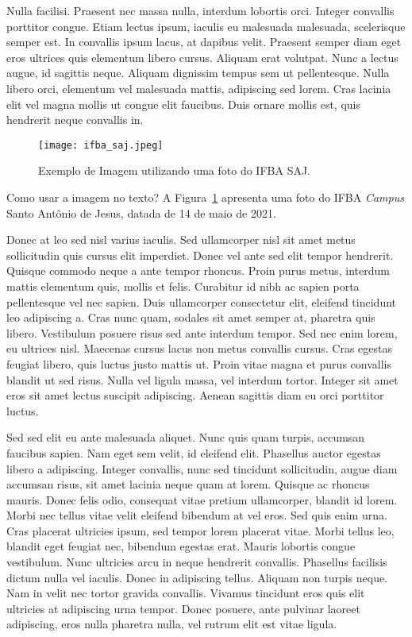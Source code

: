 \documentclass[tec, ads, scr, classic, a4paper,twoside]{ifbatcc}
\begin{document}
Nulla facilisi. Praesent nec massa nulla, interdum lobortis orci. Integer convallis porttitor congue. Etiam lectus ipsum, iaculis eu malesuada malesuada, scelerisque semper est. In convallis ipsum lacus, at dapibus velit. Praesent semper diam eget eros ultrices quis elementum libero cursus. Aliquam erat volutpat. Nunc a lectus augue, id sagittis neque. Aliquam dignissim tempus sem ut pellentesque. Nulla libero orci, elementum vel malesuada mattis, adipiscing sed lorem. Cras lacinia elit vel magna mollis ut congue elit faucibus. Duis ornare mollis est, quis hendrerit neque convallis in.


\begin{figure}[!htb]
\centerline{\texttt{[image: ifba\_saj.jpeg]}}
\caption{Exemplo de Imagem utilizando uma foto do IFBA SAJ.}
\label{fig:ifba}
\end{figure}

Como usar a imagem no texto? A Figura~\ref{fig:ifba} apresenta uma foto do IFBA \textit{Campus} Santo Antônio de Jesus, datada de 14 de maio de 2021.

Donec at leo sed nisl varius iaculis. Sed ullamcorper nisl sit amet metus sollicitudin quis cursus elit imperdiet. Donec vel ante sed elit tempor hendrerit. Quisque commodo neque a ante tempor rhoncus. Proin purus metus, interdum mattis elementum quis, mollis et felis. Curabitur id nibh ac sapien porta pellentesque vel nec sapien. Duis ullamcorper consectetur elit, eleifend tincidunt leo adipiscing a. Cras nunc quam, sodales sit amet semper at, pharetra quis libero. Vestibulum posuere risus sed ante interdum tempor. Sed nec enim lorem, eu ultrices nisl. Maecenas cursus lacus non metus convallis cursus. Cras egestas feugiat libero, quis luctus justo mattis ut. Proin vitae magna et purus convallis blandit ut sed risus. Nulla vel ligula massa, vel interdum tortor. Integer sit amet eros sit amet lectus suscipit adipiscing. Aenean sagittis diam eu orci porttitor luctus.

Sed sed elit eu ante malesuada aliquet. Nunc quis quam turpis, accumsan faucibus sapien. Nam eget sem velit, id eleifend elit. Phasellus auctor egestas libero a adipiscing. Integer convallis, nunc sed tincidunt sollicitudin, augue diam accumsan risus, sit amet lacinia neque quam at lorem. Quisque ac rhoncus mauris. Donec felis odio, consequat vitae pretium ullamcorper, blandit id lorem. Morbi nec tellus vitae velit eleifend bibendum at vel eros. Sed quis enim urna. Cras placerat ultricies ipsum, sed tempor lorem placerat vitae. Morbi tellus leo, blandit eget feugiat nec, bibendum egestas erat. Mauris lobortis congue vestibulum. Nunc ultricies arcu in neque hendrerit convallis. Phasellus facilisis dictum nulla vel iaculis. Donec in adipiscing tellus. Aliquam non turpis neque. Nam in velit nec tortor gravida convallis. Vivamus tincidunt eros quis elit ultricies at adipiscing urna tempor. Donec posuere, ante pulvinar laoreet adipiscing, eros nulla pharetra nulla, vel rutrum elit est vitae ligula.
\end{document}

